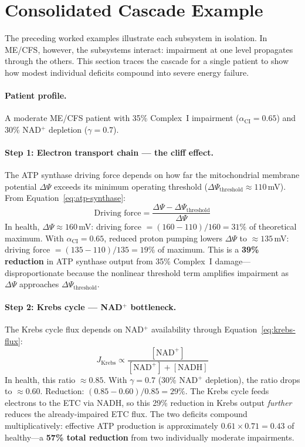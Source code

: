 \section{Consolidated Cascade Example}
\label{sec:cascade-example}

The preceding worked examples illustrate each subsystem in isolation. In ME/CFS, however, the subsystems interact: impairment at one level propagates through the others. This section traces the cascade for a single patient to show how modest individual deficits compound into severe energy failure.

\paragraph{Patient profile.} A moderate ME/CFS patient with 35\% Complex~I impairment ($\alpha_{\text{CI}} = 0.65$) and 30\% NAD$^+$ depletion ($\gamma = 0.7$).

\paragraph{Step 1: Electron transport chain --- the cliff effect.}
The ATP synthase driving force depends on how far the mitochondrial membrane potential $\Delta\Psi$ exceeds its minimum operating threshold ($\Delta\Psi_{\text{threshold}} \approx 110$\,mV). From Equation~\ref{eq:atp-synthase}:
\[
\text{Driving force} = \frac{\Delta\Psi - \Delta\Psi_{\text{threshold}}}{\Delta\Psi}
\]
In health, $\Delta\Psi \approx 160$\,mV: driving force $= (160 - 110)/160 = 31\%$ of theoretical maximum. With $\alpha_{\text{CI}} = 0.65$, reduced proton pumping lowers $\Delta\Psi$ to $\approx 135$\,mV: driving force $= (135 - 110)/135 = 19\%$ of maximum. This is a \textbf{39\% reduction} in ATP synthase output from 35\% Complex~I damage---disproportionate because the nonlinear threshold term amplifies impairment as $\Delta\Psi$ approaches $\Delta\Psi_{\text{threshold}}$.

\paragraph{Step 2: Krebs cycle --- NAD$^+$ bottleneck.}
The Krebs cycle flux depends on NAD$^+$ availability through Equation~\ref{eq:krebs-flux}:
\[
J_{\text{Krebs}} \propto \frac{[\text{NAD}^+]}{[\text{NAD}^+] + [\text{NADH}]}
\]
In health, this ratio $\approx 0.85$. With $\gamma = 0.7$ (30\% NAD$^+$ depletion), the ratio drops to $\approx 0.60$. Reduction: $(0.85 - 0.60)/0.85 = 29\%$. The Krebs cycle feeds electrons to the ETC via NADH, so this 29\% reduction in Krebs output \emph{further} reduces the already-impaired ETC flux. The two deficits compound multiplicatively: effective ATP production is approximately $0.61 \times 0.71 = 0.43$ of healthy---a \textbf{57\% total reduction} from two individually moderate impairments.

